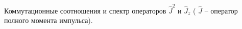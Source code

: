 \documentclass[__main__.tex]{subfiles}
\begin{document}
Коммутационные соотношения и спектр операторов $\hat{J}^2$ и $\hat{J}_z$ ( $\hat{J}$ -- оператор полного момента импульса).\\ 

\end{document}
